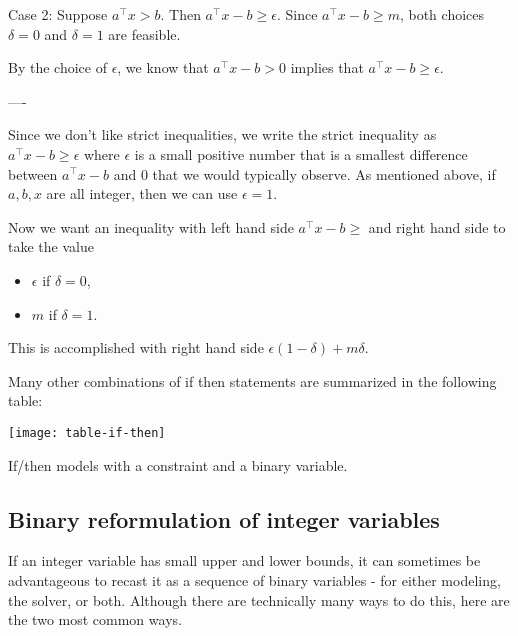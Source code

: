 \documentclass[../open-optimization/open-optimization.tex]{subfiles}
\begin{document}
Case 2:  Suppose $a^\top x > b$.  Then $a^\top x - b \geq \epsilon$.    Since $a^\top x -b \geq m$, both choices $\delta = 0$ and $\delta = 1$ are feasible.

By the choice of $\epsilon$,  we know that $a^\top x -b > 0$ implies that $a^\top x - b \geq \epsilon$.  



----


Since we don't like strict inequalities, we write the strict inequality as $a^\top x - b \geq \epsilon$ where $\epsilon$ is a small positive number that is a smallest difference between $a^\top x - b$ and $0$ that we would typically observe.  As mentioned above, if $a,b,x$ are all integer, then we can use $\epsilon = 1$.

Now we want an inequality with left hand side $a^\top x - b \geq$ and right hand side to take the value 
\begin{itemize}
\item $\epsilon$ if $\delta = 0$,
\item $m$ if $\delta = 1$.
\end{itemize}
This is accomplished with right hand side $\epsilon (1-\delta) + m\delta$.

Many other combinations of if then statements are summarized in the following table:
\begin{table}
\begin{center}
\texttt{[image: table-if-then]}\footnotemark
\end{center}
\caption{If/then models with a constraint and a binary variable.}
\end{table}

\subsection{Binary reformulation of integer variables}
If an integer variable has small upper and lower bounds, it can sometimes be advantageous to recast it as a sequence of binary variables - for either modeling, the solver, or both.   Although there are technically many ways to do this, here are the two most common ways.
\end{document}

